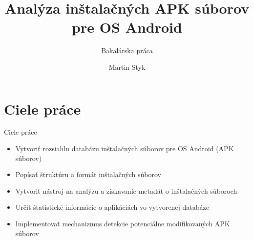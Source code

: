 \documentclass{beamer}
\title{Analýza inštalačných APK súborov pre OS Android} %
\subtitle{Bakalárska práca} %
\author{Martin Styk}
\begin{document}
  \frame{\maketitle}

\section{Ciele práce}
  \begin{frame}[label=lists]{Ciele práce}
    \begin{itemize}
    \item Vytvoriť rozsiahlu databázu inštalačných súborov pre OS Android (APK súborov)
	\item Popísať štruktúru a formát inštalačných súborov
	\item Vytvoriť nástroj na analýzu a získavanie metadát o inštalačných súboroch
	\item Určiť štatistické informácie o aplikáciách vo vytvorenej databáze
	\item Implementovať mechanizmus detekcie potenciálne modifikovaných APK súborov
    \end{itemize}  
  \end{frame}

  
\end{document}
